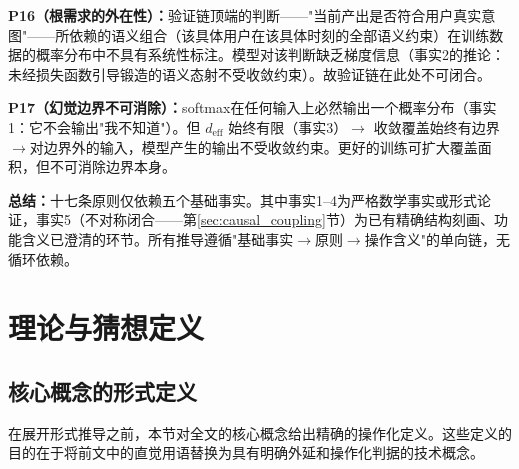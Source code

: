 \documentclass[11pt,a4paper]{article}
\theoremstyle{definition}
\begin{document}
\textbf{P16（根需求的外在性）：}验证链顶端的判断——"当前产出是否符合用户真实意图"——所依赖的语义组合（该具体用户在该具体时刻的全部语义约束）在训练数据的概率分布中不具有系统性标注。模型对该判断缺乏梯度信息（事实2的推论：未经损失函数引导锻造的语义态射不受收敛约束）。故验证链在此处不可闭合。

\textbf{P17（幻觉边界不可消除）：}softmax在任何输入上必然输出一个概率分布（事实1：它不会输出"我不知道"）。但 $d_{\text{eff}}$ 始终有限（事实3）$\to$ 收敛覆盖始终有边界$\to$对边界外的输入，模型产生的输出不受收敛约束。更好的训练可扩大覆盖面积，但不可消除边界本身。

\medskip
\textbf{总结：}十七条原则仅依赖五个基础事实。其中事实1--4为严格数学事实或形式论证，事实5（不对称闭合——第\ref{sec:causal_coupling}节）为已有精确结构刻画、功能含义已澄清的环节。所有推导遵循"基础事实$\to$原则$\to$操作含义"的单向链，无循环依赖。


\section{理论与猜想定义}
\label{sec:definitions}

\subsection{核心概念的形式定义}

在展开形式推导之前，本节对全文的核心概念给出精确的操作化定义。这些定义的目的在于将前文中的直觉用语替换为具有明确外延和操作化判据的技术概念。
\end{document}
